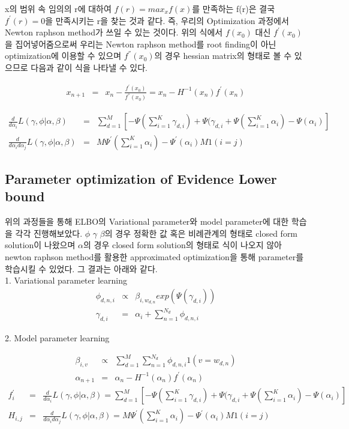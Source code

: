 \documentclass[draft=false]{oblivoir}
\begin{document}
x의 범위 속 임의의 r에 대하여 $f(r) = max_{x}f(x)$를 만족하는 f(r)은 결국 $f^{'}(r) = 0$을 만족시키는 r을 찾는 것과 같다. 즉, 우리의 Optimization 과정에서 Newton raphson method가 쓰일 수 있는 것이다. 위의 식에서 $f(x_{0})$ 대신 $f^{'}(x_{0})$을 집어넣어줌으로써 우리는 Newton raphson method를 root finding이 아닌 optimization에 이용할 수 있으며 $f^{''}(x_{0})$의 경우 hessian matrix의 형태로 볼 수 있으므로 다음과 같이 식을 나타낼 수 있다.

\begin{eqnarray}
x_{n+1} &=& x_{n}-\frac{f^{'}(x_{0})}{f^{''}(x_{0})} = x_{n}-H^{-1}(x_{n})f^{'}(x_{n})
\end{eqnarray}

\begin{eqnarray}
\frac{d}{d\alpha_{i}}L(\gamma,\phi|\alpha,\beta)\nonumber & = &\sum^{M}_{d=1}[-\Psi(\sum^{K}_{i=1}\gamma_{d,i})+\Psi(\gamma_{d,i}+\Psi(\sum^{K}_{i=1}\alpha_{i})-\Psi(\alpha_{i})]\nonumber \\ 
\frac{d}{d\alpha_{i}d\alpha_{j}}L(\gamma,\phi|\alpha,\beta)\nonumber & = &
M\Psi^{'}(\sum^{K}_{i=1}\alpha_{i})-\Psi^{'}(\alpha_{i})M1(i=j)
\end{eqnarray}

\subsection{Parameter optimization of Evidence Lower bound}
위의 과정들을 통해 ELBO의 Variational parameter와 model parameter에 대한 학습을 각각 진행해보았다. $\phi$ $\gamma$ $\beta$의 경우 정확한 값 혹은 비례관계의 형태로 closed form solution이 나왔으며 $\alpha$의 경우 closed form solution의 형태로 식이 나오지 않아 newton raphson method를 활용한 approximated optimization을 통해 parameter를 학습시킬 수 있었다. 그 결과는 아래와 같다.\\

1. Variational parameter learning
\begin{eqnarray}
\phi_{d,n,i} & \propto & \beta_{i,w_{d,n}}exp(\Psi(\gamma_{d,i}))\nonumber \\
\gamma_{d,i} & = & \alpha_{i}+ \sum^{N_{d}}_{n=1}\phi_{d,n,i}\nonumber
\end{eqnarray}

2. Model parameter learning

\begin{eqnarray}
\beta_{i,v} &\propto& \sum^{M}_{d=1}\sum^{N_{d}}_{n=1}\phi_{d,n,i}1(v=w_{d,n})\nonumber\\
\alpha_{n+1} &=&
\alpha_{n}-H^{-1}(\alpha_{n})f^{'}(\alpha_{n})\nonumber
\end{eqnarray}
\begin{eqnarray}
f^{'}_{i} & = & \frac{d}{d\alpha_{i}}L(\gamma,\phi|\alpha,\beta) = \sum^{M}_{d=1}[-\Psi(\sum^{K}_{i=1}\gamma_{d,i})+\Psi(\gamma_{d,i}+\Psi(\sum^{K}_{i=1}\alpha_{i})-\Psi(\alpha_{i})]\nonumber\\
 H_{i,j}  & = & \frac{d}{d\alpha_{i}d\alpha_{j}}L(\gamma,\phi|\alpha,\beta) = M\Psi^{'}(\sum^{K}_{i=1}\alpha_{i})-\Psi^{'}(\alpha_{i})M1(i=j)
\end{eqnarray}
\end{document}
